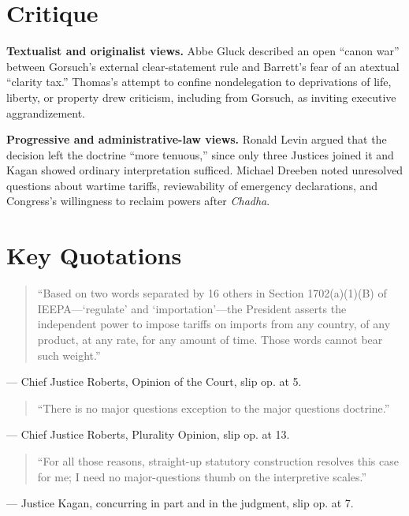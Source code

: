 \documentclass[12pt]{article}
\begin{document}
\section{Critique}

\textbf{Textualist and originalist views.} Abbe Gluck described an open ``canon war'' between Gorsuch's external clear-statement rule and Barrett's fear of an atextual ``clarity tax.'' Thomas's attempt to confine nondelegation to deprivations of life, liberty, or property drew criticism, including from Gorsuch, as inviting executive aggrandizement.

\textbf{Progressive and administrative-law views.} Ronald Levin argued that the decision left the doctrine ``more tenuous,'' since only three Justices joined it and Kagan showed ordinary interpretation sufficed. Michael Dreeben noted unresolved questions about wartime tariffs, reviewability of emergency declarations, and Congress's willingness to reclaim powers after \textit{Chadha}.

\section{Key Quotations}

\begin{quote}
``Based on two words separated by 16 others in Section 1702(a)(1)(B) of IEEPA---`regulate' and `importation'---the President asserts the independent power to impose tariffs on imports from any country, of any product, at any rate, for any amount of time. Those words cannot bear such weight.''
\end{quote}
\noindent --- Chief Justice Roberts, Opinion of the Court, slip op. at 5.

\begin{quote}
``There is no major questions exception to the major questions doctrine.''
\end{quote}
\noindent --- Chief Justice Roberts, Plurality Opinion, slip op. at 13.

\begin{quote}
``For all those reasons, straight-up statutory construction resolves this case for me; I need no major-questions thumb on the interpretive scales.''
\end{quote}
\noindent --- Justice Kagan, concurring in part and in the judgment, slip op. at 7.
\end{document}
